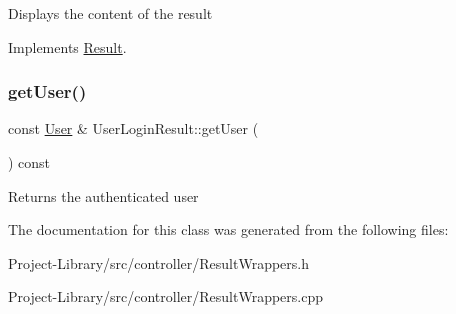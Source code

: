 Displays the content of the result 

Implements \hyperlink{classResult_a625729bae46b53c231feb50a91b1390e}{Result}.

\mbox{\label{classUserLoginResult_a20c86ea6dabe661df16c24f17891e77f}} 
\subsubsection{\texorpdfstring{get\+User()}{getUser()}}
{\footnotesize\ttfamily const \hyperlink{classUser}{User} \& User\+Login\+Result\+::get\+User (\begin{DoxyParamCaption}{ }\end{DoxyParamCaption}) const}

Returns the authenticated user 

The documentation for this class was generated from the following files\+:\begin{DoxyCompactItemize}
\item 
Project-\/\+Library/src/controller/Result\+Wrappers.\+h\item 
Project-\/\+Library/src/controller/Result\+Wrappers.\+cpp\end{DoxyCompactItemize}
